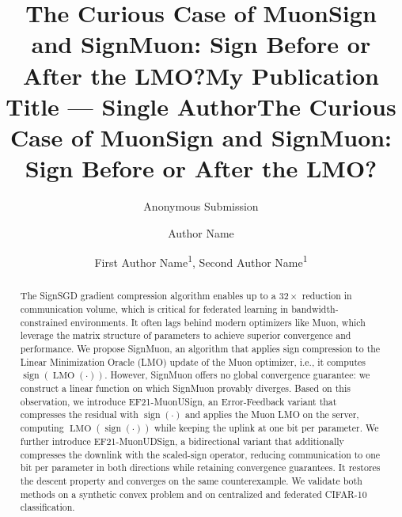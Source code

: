 \documentclass[letterpaper]{article} %
\title{The Curious Case of MuonSign and SignMuon: Sign Before or After the LMO?}
\author{
    Anonymous Submission
}
\title{My Publication Title --- Single Author}
\author {
    Author Name
}
\title{The Curious Case of MuonSign and SignMuon: Sign Before or After the LMO?}
\author {
    First Author Name\textsuperscript{\rm 1}\equalcontrib,
    Second Author Name\textsuperscript{\rm 1}\corresponding
}
\begin{document}
\maketitle

\begin{abstract}\label{sec:abs}
The SignSGD gradient compression algorithm enables up to a $32\times$ reduction in communication volume, which is critical for federated learning in bandwidth-constrained environments. It often lags behind modern optimizers like Muon, which leverage the matrix structure of parameters to achieve superior convergence and performance. We propose SignMuon, an algorithm that applies sign compression to the Linear Minimization Oracle (LMO) update of the Muon optimizer, i.e., it computes $\operatorname{sign}(\operatorname{LMO}(\cdot))$. However, SignMuon offers no global convergence guarantee: we construct a linear function on which SignMuon provably diverges. Based on this observation, we introduce EF21-MuonUSign, an Error-Feedback variant that compresses the residual with $\operatorname{sign}(\cdot)$ and applies the Muon LMO on the server, computing $\operatorname{LMO}(\operatorname{sign}(\cdot))$ while keeping the uplink at one bit per parameter. We further introduce EF21-MuonUDSign, a bidirectional variant that additionally compresses the downlink with the scaled-sign operator, reducing communication to one bit per parameter in both directions while retaining convergence guarantees. It restores the descent property and converges on the same counterexample. We validate both methods on a synthetic convex problem and on centralized and federated CIFAR-10 classification.
\end{abstract}


\end{document}
